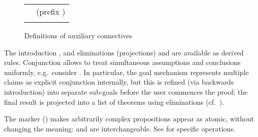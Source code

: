\begin{isabellebody}
\begin{isamarkuptext}
\begin{figure}[htb]
\begin{center}
\begin{tabular}{ll}
  \isa{TYPE\ {\isaliteral{3A}{\isacharcolon}}{\isaliteral{3A}{\isacharcolon}}\ {\isaliteral{5C3C616C7068613E}{\isasymalpha}}\ itself} & (prefix \isa{TYPE}) \\
  \isa{{\isaliteral{28}{\isacharparenleft}}unspecified{\isaliteral{29}{\isacharparenright}}} \\
  \end{tabular}
  \caption{Definitions of auxiliary connectives}\label{fig:pure-aux}
  \end{center}
  \end{figure}

  The introduction , and eliminations
  (projections)  and  are
  available as derived rules.  Conjunction allows to treat
  simultaneous assumptions and conclusions uniformly, e.g.\ consider
  .  In particular, the goal mechanism
  represents multiple claims as explicit conjunction internally, but
  this is refined (via backwards introduction) into separate sub-goals
  before the user commences the proof; the final result is projected
  into a list of theorems using eliminations (cf.\
  ).

  The  marker () makes arbitrarily complex
  propositions appear as atomic, without changing the meaning:  and  are interchangeable.  See
  \secref{sec:tactical-goals} for specific operations.


\end{isamarkuptext}
\end{isabellebody}
